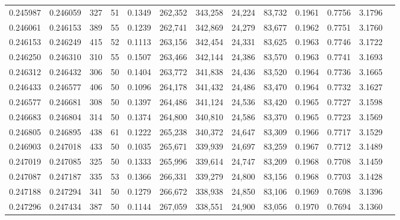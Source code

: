 \begin{tabular}{rrrrrrrrrrrrr}
0.245987 & 0.246059 &   327 &  51 &                                     0.1349 & 262,352 & 343,258 &  24,224 &  83,732 & 0.1961 & 0.7756 & 3.1796 \\
0.246061 & 0.246153 &   389 &  55 &                                     0.1239 & 262,741 & 342,869 &  24,279 &  83,677 & 0.1962 & 0.7751 & 3.1760 \\
0.246153 & 0.246249 &   415 &  52 &                                     0.1113 & 263,156 & 342,454 &  24,331 &  83,625 & 0.1963 & 0.7746 & 3.1722 \\
0.246250 & 0.246310 &   310 &  55 &                                     0.1507 & 263,466 & 342,144 &  24,386 &  83,570 & 0.1963 & 0.7741 & 3.1693 \\
0.246312 & 0.246432 &   306 &  50 &                                     0.1404 & 263,772 & 341,838 &  24,436 &  83,520 & 0.1964 & 0.7736 & 3.1665 \\
0.246433 & 0.246577 &   406 &  50 &                                     0.1096 & 264,178 & 341,432 &  24,486 &  83,470 & 0.1964 & 0.7732 & 3.1627 \\
0.246577 & 0.246681 &   308 &  50 &                                     0.1397 & 264,486 & 341,124 &  24,536 &  83,420 & 0.1965 & 0.7727 & 3.1598 \\
0.246683 & 0.246804 &   314 &  50 &                                     0.1374 & 264,800 & 340,810 &  24,586 &  83,370 & 0.1965 & 0.7723 & 3.1569 \\
0.246805 & 0.246895 &   438 &  61 &                                     0.1222 & 265,238 & 340,372 &  24,647 &  83,309 & 0.1966 & 0.7717 & 3.1529 \\
0.246903 & 0.247018 &   433 &  50 &                                     0.1035 & 265,671 & 339,939 &  24,697 &  83,259 & 0.1967 & 0.7712 & 3.1489 \\
0.247019 & 0.247085 &   325 &  50 &                                     0.1333 & 265,996 & 339,614 &  24,747 &  83,209 & 0.1968 & 0.7708 & 3.1459 \\
0.247087 & 0.247187 &   335 &  53 &                                     0.1366 & 266,331 & 339,279 &  24,800 &  83,156 & 0.1968 & 0.7703 & 3.1428 \\
0.247188 & 0.247294 &   341 &  50 &                                     0.1279 & 266,672 & 338,938 &  24,850 &  83,106 & 0.1969 & 0.7698 & 3.1396 \\
0.247296 & 0.247434 &   387 &  50 &                                     0.1144 & 267,059 & 338,551 &  24,900 &  83,056 & 0.1970 & 0.7694 & 3.1360 \\

\end{tabular}
